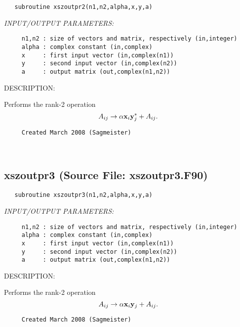 \documentclass[11pt]{article}
\begin{document}
\begin{verbatim}   subroutine xszoutpr2(n1,n2,alpha,x,y,a)\end{verbatim}{\em INPUT/OUTPUT PARAMETERS:}
\begin{verbatim}     n1,n2 : size of vectors and matrix, respectively (in,integer)
     alpha : complex constant (in,complex)
     x     : first input vector (in,complex(n1))
     y     : second input vector (in,complex(n2))
     a     : output matrix (out,complex(n1,n2))\end{verbatim}
{\sf DESCRIPTION:\\ }


     Performs the rank-2 operation
     $$ A_{ij}\rightarrow\alpha{\bf x}_i{\bf y}_j^*+A_{ij}. $$
  
\begin{verbatim}     Created March 2008 (Sagmeister)\end{verbatim}


 
 
\mbox{}\hrulefill\ 
 
\subsection{xszoutpr3 (Source File: xszoutpr3.F90)}


\begin{verbatim}   subroutine xszoutpr3(n1,n2,alpha,x,y,a)\end{verbatim}{\em INPUT/OUTPUT PARAMETERS:}
\begin{verbatim}     n1,n2 : size of vectors and matrix, respectively (in,integer)
     alpha : complex constant (in,complex)
     x     : first input vector (in,complex(n1))
     y     : second input vector (in,complex(n2))
     a     : output matrix (out,complex(n1,n2))\end{verbatim}
{\sf DESCRIPTION:\\ }


     Performs the rank-2 operation
     $$ A_{ij}\rightarrow\alpha{\bf x}_i{\bf y}_j+A_{ij}. $$
  
\begin{verbatim}     Created March 2008 (Sagmeister)\end{verbatim}
\end{document}
